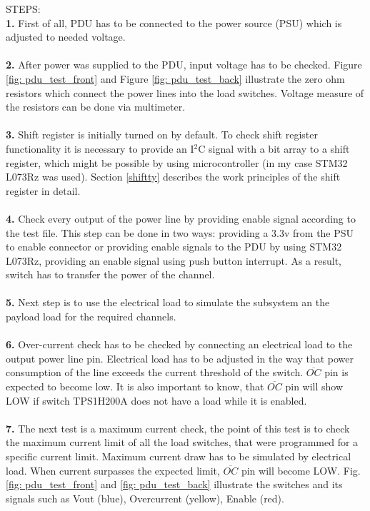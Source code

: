 STEPS:\\
\textbf{1.}  First of all, PDU has to be connected to the power source (PSU) which is adjusted to needed voltage.\\ \\
\textbf{2.} After power was supplied to the PDU, input voltage has to be checked. Figure \ref{fig: pdu_test_front} and Figure \ref{fig: pdu_test_back} illustrate the zero ohm resistors which connect the power lines into the load switches. Voltage measure of the resistors can be done via multimeter. \\ \\
\textbf{3.} Shift register is initially turned on by default. To check shift register functionality it is necessary to provide an I$^2$C signal with a bit array to a shift register, which might be possible by using microcontroller (in my case STM32 L073Rz was used). Section \ref{shiftty} describes the work principles of the shift register in detail. \\ \\
\textbf{4.} Check every output of the power line by providing enable signal according  to the test file. This step can be done in two ways: providing a 3.3v from the PSU to enable connector or providing enable signals to the PDU by using STM32 L073Rz, providing an enable signal using push button interrupt. As a result, switch has to transfer the power of the channel.\\ \\
\textbf{5.} Next step is to use the electrical load to simulate the subsystem an the payload load for the required channels.\\ \\
\textbf{6.} Over-current check has to be checked by connecting an electrical load to the output power line pin. Electrical load has to be adjusted in the way that power consumption of the line exceeds the current threshold of the switch. $\overline{OC}$ pin is expected to become low.
It is also important to know, that $\overline{OC}$ pin will show LOW if switch TPS1H200A does not have a load while it is enabled.\\ \\
\textbf{7.} The next test is a maximum current check, the point of this test is to check the maximum current limit of all the load switches, that were programmed for a
specific current limit. Maximum current draw has to be simulated by electrical load. When current surpasses the expected
limit, $\overline{OC}$ pin will become LOW.
Fig.\ref{fig: pdu_test_front} and \ref{fig: pdu_test_back} illustrate the switches and its signals such as Vout (blue), Overcurrent (yellow), Enable (red).

